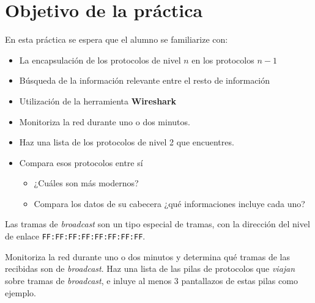 

\renewcommand{\hmwkTitle}{Análisis de tráfico con \textbf{Wireshark}}

\renewcommand{\hmwkClass}{Plan. y Admin. de Redes}




\primerapagina


\section{Objetivo de la práctica}
En esta práctica se espera que el alumno se familiarize con:
\begin{itemize}
\item La encapsulación de los protocolos de nivel $n$ en los protocolos $n-1$
\item Búsqueda de la información relevante entre el resto de información
\item Utilización de la herramienta \textbf{Wireshark}
  
\end{itemize}

\begin{homeworkProblem}

  \begin{itemize}
  \item Monitoriza la red durante uno o dos minutos. 
  \item Haz una lista de los protocolos de nivel 2 que encuentres.
  \item Compara esos protocolos entre sí
    \begin{itemize}
    \item ¿Cuáles son más modernos?
    \item Compara los datos de su cabecera ¿qué informaciones incluye cada uno?
    \end{itemize}
  \end{itemize}
  
\end{homeworkProblem}

\begin{homeworkProblem}

  Las tramas de \textit{broadcast} son un tipo especial de tramas, con la dirección del nivel de enlace \texttt{FF:FF:FF:FF:FF:FF:FF:FF}.

  Monitoriza la red durante uno o dos minutos y determina qué tramas de las recibidas son de \textit{broadcast}. Haz una lista de las pilas de protocolos que \textit{viajan} sobre tramas de \textit{broadcast}, e inluye al menos 3 pantallazos de estas pilas como ejemplo.

\end{homeworkProblem}


